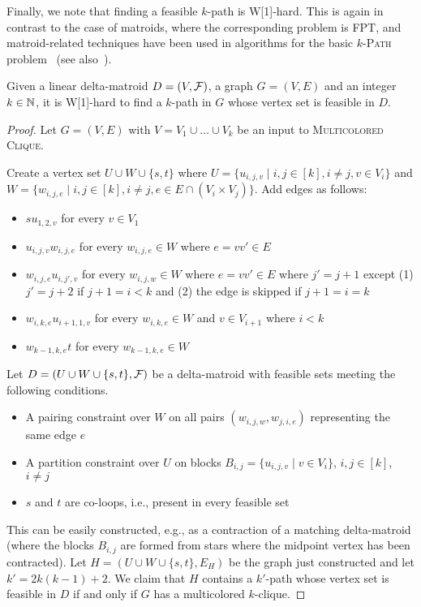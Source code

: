 Finally, we note that finding a feasible $k$-path is W[1]-hard.
This is again in contrast to the case of matroids, where the
corresponding problem is FPT, and matroid-related techniques have been
used in algorithms for the basic \textsc{$k$-Path}
problem~\cite{EKW23,FominLPS16JACM} (see also~\cite{FominGKSS23soda}).

\begin{theorem}
  Given a linear delta-matroid $D=(V,\mathcal F)$, a graph $G=(V,E)$ and an integer $k \in \mathbb N$, 
  it is W[1]-hard to find a $k$-path in $G$ whose vertex set is feasible in $D$. 
\end{theorem}
\begin{proof}
  Let $G=(V,E)$ with $V=V_1 \cup \ldots \cup V_k$ be
  an input to \textsc{Multicolored Clique}.
  
  Create a vertex set $U \cup W \cup \{s,t\}$ where
  $U=\{u_{i,j,v} \mid i, j \in [k], i \neq j, v \in V_i\}$ and
  $W=\{w_{i,j,e} \mid i, j \in [k], i \neq j, e \in E \cap (V_i \times V_j)\}$.
  Add edges as follows:
  \begin{itemize}
  \item $su_{1,2,v}$ for every $v \in V_1$
  \item $u_{i,j,v}w_{i,j,e}$ for every $w_{i,j,e} \in W$ where $e=vv' \in E$
  \item $w_{i,j,e}u_{i,j',v}$ for every $w_{i,j,w} \in W$ where $e=vv' \in E$
    where $j'=j+1$ except (1) $j'=j+2$ if $j+1=i<k$ and (2) the edge is
    skipped if $j+1=i=k$  
  \item $w_{i,k,e}u_{i+1,1,v}$ for every $w_{i,k,e} \in W$ and $v \in V_{i+1}$
    where $i<k$
  \item $w_{k-1,k,e}t$ for every $w_{k-1,k,e} \in W$
  \end{itemize}
  Let $D=(U \cup W \cup \{s,t\}, \mathcal F)$ be a delta-matroid with feasible sets meeting the following conditions.
  \begin{itemize}
  \item A pairing constraint over $W$ on all pairs $(w_{i,j,w},w_{j,i,e})$
    representing the same edge $e$
  \item A partition constraint over $U$ on blocks $B_{i,j}=\{u_{i,j,v} \mid v \in V_i\}$,
    $i, j \in [k]$, $i \neq j$
  \item $s$ and $t$ are co-loops, i.e., present in every feasible set
  \end{itemize}
  This can be easily constructed, e.g., as a contraction of a matching
  delta-matroid (where the blocks $B_{i,j}$ are formed from stars
  where the midpoint vertex has been contracted).
  Let $H=(U \cup W \cup \{s,t\}, E_H)$ be the graph just constructed and let $k'=2k(k-1)+2$.
  We claim that $H$ contains a $k'$-path whose vertex set is feasible in $D$
  if and only if $G$ has a multicolored $k$-clique.
  

\end{proof}
